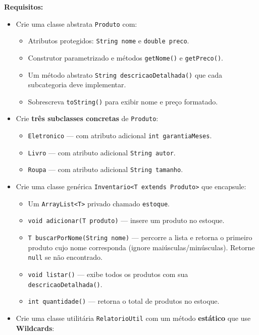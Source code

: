 \documentclass[12pt, a4paper]{article}
\begin{document}
\textbf{Requisitos:}
\begin{itemize}
    \item Crie uma classe abstrata \texttt{Produto} com:
    \begin{itemize}
        \item Atributos protegidos: \texttt{String nome} e \texttt{double preco}.
        \item Construtor parametrizado e métodos \texttt{getNome()} e \texttt{getPreco()}.
        \item Um método abstrato \texttt{String descricaoDetalhada()} que cada subcategoria deve implementar.
        \item Sobrescreva \texttt{toString()} para exibir nome e preço formatado.
    \end{itemize}
    \item Crie \textbf{três subclasses concretas} de \texttt{Produto}:
    \begin{itemize}
        \item \texttt{Eletronico} — com atributo adicional \texttt{int garantiaMeses}.
        \item \texttt{Livro} — com atributo adicional \texttt{String autor}.
        \item \texttt{Roupa} — com atributo adicional \texttt{String tamanho}.
    \end{itemize}
    \item Crie uma classe genérica \texttt{Inventario<T extends Produto>} que encapsule:
    \begin{itemize}
        \item Um \texttt{ArrayList<T>} privado chamado \texttt{estoque}.
        \item \texttt{void adicionar(T produto)} — insere um produto no estoque.
        \item \texttt{T buscarPorNome(String nome)} — percorre a lista e retorna o primeiro produto cujo nome corresponda (ignore maiúsculas/minúsculas). Retorne \texttt{null} se não encontrado.
        \item \texttt{void listar()} — exibe todos os produtos com sua \texttt{descricaoDetalhada()}.
        \item \texttt{int quantidade()} — retorna o total de produtos no estoque.
    \end{itemize}
    \item Crie uma classe utilitária \texttt{RelatorioUtil} com um método \textbf{estático} que use \textbf{Wildcards}:
    \begin{itemize}

\end{itemize}
\end{itemize}
\end{document}
